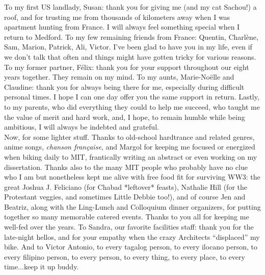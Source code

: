 To my first US landlady, Susan: thank you for giving me (and my cat Sachou!) a roof, and for trusting me from thousands of kilometers away when I was apartment hunting from France. I will always feel something special when I return to Medford. To my few remaining friends from France: Quentin, Charlène, Sam, Marion, Patrick, Ali, Victor. I've been glad to have you in my life, even if we don't talk that often and things might have gotten tricky for various reasons. To my former partner, Félix: thank you for your support throughout our eight years together. They remain on my mind. To my aunts, Marie-Noëlle and Claudine: thank you for always being there for me, especially during difficult personal times. I hope I can one day offer you the same support in return. Lastly, to my parents, who did everything they could to help me succeed, who taught me the value of merit and hard work, and, I hope, to remain humble while being ambitious, I will always be indebted and grateful. \\

Now, for some lighter stuff. Thanks to old-school hardtrance and related genres, anime songs, \textit{chanson française}, and Margol for keeping me focused or energized when biking daily to MIT, frantically writing an abstract or even working on my dissertation.
Thanks also to the many MIT people who probably have no clue who I am but nonetheless kept me alive with free food fit for surviving WW3: the great Joshua J. Feliciano (for Chabad *leftover* feasts), Nathalie Hill (for the Protestant veggies, and sometimes Little Debbie too!), and of course Jen and Beatriz, along with the Ling-Lunch and Colloquium dinner organizers, for putting together so many memorable catered events. Thanks to you all for keeping me well-fed over the years. To Sandra, our favorite facilities staff: thank you for the late-night hellos, and for your empathy when the crazy Architects ``displaced'' my bike. And to Victor Antonio, to every tagalog person, to every ilocano person, to every filipino person, to every person, to every thing, to every place, to every time...keep it up buddy.


